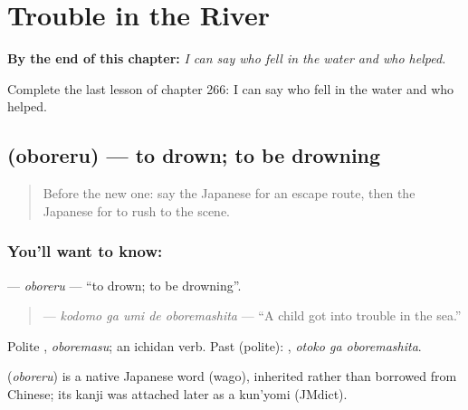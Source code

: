 
\chapter{Trouble in the River}
\label{ch:ja-trouble-in-the-river}

\begin{chapteropening}
\textbf{By the end of this chapter:} \emph{I can say who fell in the water and who helped.}

Complete the last lesson of chapter 266: I can say who fell in the water and who helped.
\end{chapteropening}

\section[\texorpdfstring{\ja{おぼれる} (oboreru)}{おぼれる (oboreru)}]{ (oboreru) — to drown; to be drowning}

\label{lesson:JA-C266-oboreru}



\begin{quote}
Before the new one: say the Japanese for an escape route, then the Japanese for to rush to the scene.
\end{quote}

\subsection*{You'll want to know: }
\textbf{} — \emph{oboreru} — \textquotedblleft{}to drown; to be drowning\textquotedblright{}.

\begin{quote}
\textbf{  } — \emph{kodomo ga umi de oboremashita} — \textquotedblleft{}A child got into trouble in the sea.\textquotedblright{}
\end{quote}

Polite \textbf{}, \emph{oboremasu}; an ichidan verb. Past (polite): \textbf{ }, \emph{otoko ga oboremashita}.

\begin{cousinweb}
\textbf{} (\emph{oboreru}) is a native Japanese word (wago), inherited rather than borrowed from Chinese; its kanji was attached later as a kun'yomi (JMdict).
\end{cousinweb}

